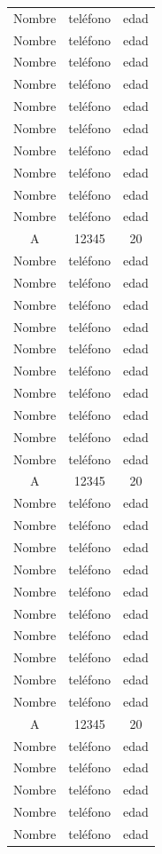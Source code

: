 \documentclass[12pt]{article}
\begin{document}
\begin{longtable}[c]{|ccc|}
Nombre & teléfono & edad \\
Nombre & teléfono & edad \\
Nombre & teléfono & edad \\
Nombre & teléfono & edad \\
Nombre & teléfono & edad \\
Nombre & teléfono & edad \\
Nombre & teléfono & edad \\
Nombre & teléfono & edad \\
Nombre & teléfono & edad \\
Nombre & teléfono & edad \\
A & 12345 & 20 \\
Nombre & teléfono & edad \\
Nombre & teléfono & edad \\
Nombre & teléfono & edad \\
Nombre & teléfono & edad \\
Nombre & teléfono & edad \\
Nombre & teléfono & edad \\
Nombre & teléfono & edad \\
Nombre & teléfono & edad \\
Nombre & teléfono & edad \\
Nombre & teléfono & edad \\
A & 12345 & 20 \\
Nombre & teléfono & edad \\
Nombre & teléfono & edad \\
Nombre & teléfono & edad \\
Nombre & teléfono & edad \\
Nombre & teléfono & edad \\
Nombre & teléfono & edad \\
Nombre & teléfono & edad \\
Nombre & teléfono & edad \\
Nombre & teléfono & edad \\
Nombre & teléfono & edad \\
A & 12345 & 20 \\
Nombre & teléfono & edad \\
Nombre & teléfono & edad \\
Nombre & teléfono & edad \\
Nombre & teléfono & edad \\
Nombre & teléfono & edad \\

\end{longtable}
\end{document}
